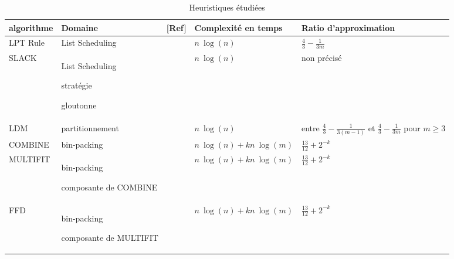 \documentclass[a4paper,12pt]{report}
\theoremstyle{plain}				%
\theoremstyle{definition}				%
\begin{document}
\begin{landscape}
\begin{table}[h] %
\centering
\begin{tabular}{lp{3cm}lll}
\hline
algorithme 	
& Domaine 
& [Ref] 
& Complexité en temps 
& Ratio d'approximation
\\
\hline

LPT Rule 	
& List Scheduling
& \cite{graham1966bounds} 
& $n~\log(n)$ 
& $\frac{4}{3}-\frac{1}{3m}$ 
\\			

SLACK
& List Scheduling

  stratégie 
  
  gloutonne
& \cite{della2020longest} 
& $n~\log(n)$ 
& non précisé 
\\

LDM
&  partitionnement 
& \cite{karmarkar1982differencing} 
& $n~\log(n)$ 
& 	entre $ \frac{4}{3}-\frac{1}{3(m-1)}$	\newline
	et $\frac{4}{3}-\frac{1}{3 m}$ 			\newline
 	pour $m\geq3$
\\ 

COMBINE
& bin-packing 
& \cite{lee1988multiprocessor} 
& $ n~\log(n) + kn~\log(m)$ 
& $\frac{13}{12} + 2^{-k}$ 
\\
\hline
MULTIFIT 	&	bin-packing
 
				composante de COMBINE
& \cite{lee1988multiprocessor} 
& $ n~\log(n) + kn~\log(m)$ 
& $\frac{13}{12} + 2^{-k}$ 
\\
FFD
& bin-packing
		
  composante de MULTIFIT 
& \cite{lee1988multiprocessor} 
& $ n~\log(n) + kn~\log(m)$ 
& $\frac{13}{12} + 2^{-k}$ 
\\

\hline
\end{tabular}
\caption{Heuristiques étudiées}
\label{table:Heuritiques}
\end{table}
\end{landscape}
\end{document}

